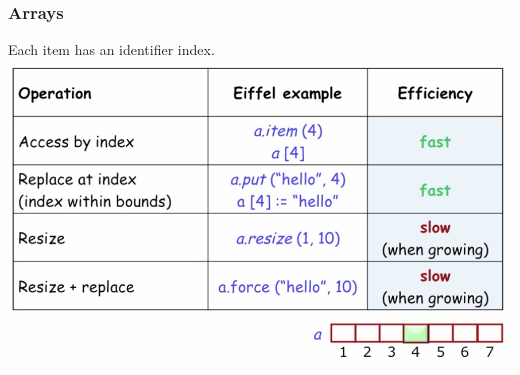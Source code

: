 \documentclass[11pt]{article}
\newcommand\back[1][-3cm]{\hspace*{#1}}
\begin{document}
\subsubsection{Arrays}
Each item has an identifier index.\\
\back\includegraphics[scale = 1]{array}
\end{document}
